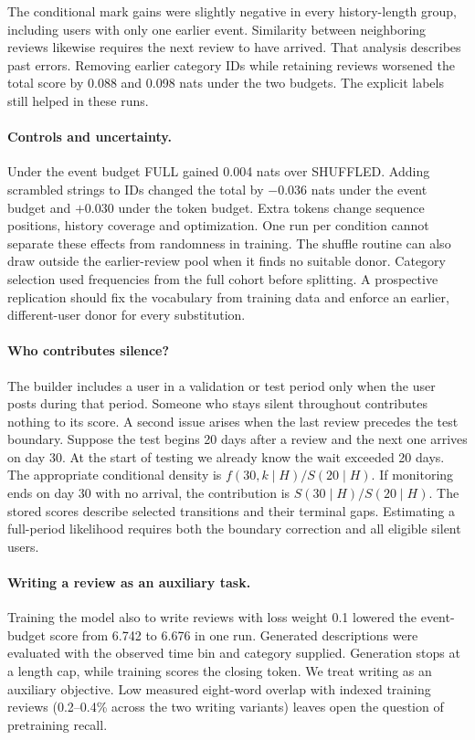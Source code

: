 \documentclass[sigconf,nonacm]{acmart}
\begin{document}
The conditional mark gains were slightly negative in every history-length group, including users with only one earlier event. Similarity between neighboring reviews likewise requires the next review to have arrived. That analysis describes past errors. Removing earlier category IDs while retaining reviews worsened the total score by 0.088 and 0.098 nats under the two budgets. The explicit labels still helped in these runs.

\paragraph{Controls and uncertainty.}
Under the event budget FULL gained 0.004 nats over SHUFFLED. Adding scrambled strings to IDs changed the total by $-0.036$ nats under the event budget and $+0.030$ under the token budget. Extra tokens change sequence positions, history coverage and optimization. One run per condition cannot separate these effects from randomness in training. The shuffle routine can also draw outside the earlier-review pool when it finds no suitable donor. Category selection used frequencies from the full cohort before splitting. A prospective replication should fix the vocabulary from training data and enforce an earlier, different-user donor for every substitution.

\paragraph{Who contributes silence?}
The builder includes a user in a validation or test period only when the user posts during that period. Someone who stays silent throughout contributes nothing to its score. A second issue arises when the last review precedes the test boundary. Suppose the test begins 20 days after a review and the next one arrives on day 30. At the start of testing we already know the wait exceeded 20 days. The appropriate conditional density is $f(30,k\mid H)/S(20\mid H)$. If monitoring ends on day 30 with no arrival, the contribution is $S(30\mid H)/S(20\mid H)$. The stored scores describe selected transitions and their terminal gaps. Estimating a full-period likelihood requires both the boundary correction and all eligible silent users.

\paragraph{Writing a review as an auxiliary task.}
Training the model also to write reviews with loss weight 0.1 lowered the event-budget score from 6.742 to 6.676 in one run. Generated descriptions were evaluated with the observed time bin and category supplied. Generation stops at a length cap, while training scores the closing token. We treat writing as an auxiliary objective. Low measured eight-word overlap with indexed training reviews (0.2--0.4\% across the two writing variants) leaves open the question of pretraining recall.
\end{document}
